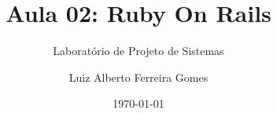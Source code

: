 \author{Luiz Alberto Ferreira Gomes}
\title{Aula 02: Ruby On Rails}
\subtitle{Laboratório de Projeto de Sistemas}
\date{\today}
